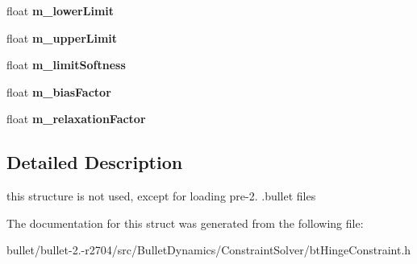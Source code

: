 \begin{DoxyCompactItemize}
\item 
\hypertarget{structbt_hinge_constraint_double_data_a4a3d074b01540cc915adba04f72924d0}{float {\bfseries m\+\_\+lower\+Limit}}\label{structbt_hinge_constraint_double_data_a4a3d074b01540cc915adba04f72924d0}

\item 
\hypertarget{structbt_hinge_constraint_double_data_a231ef521e7d4848c5b9226ff50dbbd12}{float {\bfseries m\+\_\+upper\+Limit}}\label{structbt_hinge_constraint_double_data_a231ef521e7d4848c5b9226ff50dbbd12}

\item 
\hypertarget{structbt_hinge_constraint_double_data_ad0ae0fdfdc31180fbeebf1d160c86b77}{float {\bfseries m\+\_\+limit\+Softness}}\label{structbt_hinge_constraint_double_data_ad0ae0fdfdc31180fbeebf1d160c86b77}

\item 
\hypertarget{structbt_hinge_constraint_double_data_ac94487908f2a28df8be317ef588fb382}{float {\bfseries m\+\_\+bias\+Factor}}\label{structbt_hinge_constraint_double_data_ac94487908f2a28df8be317ef588fb382}

\item 
\hypertarget{structbt_hinge_constraint_double_data_abdea05be210308a95a740b14f483e8c5}{float {\bfseries m\+\_\+relaxation\+Factor}}\label{structbt_hinge_constraint_double_data_abdea05be210308a95a740b14f483e8c5}

\end{DoxyCompactItemize}


\subsection{Detailed Description}
this structure is not used, except for loading pre-\/2. .bullet files 

The documentation for this struct was generated from the following file\+:\begin{DoxyCompactItemize}
\item 
bullet/bullet-\/2.-\/r2704/src/\+Bullet\+Dynamics/\+Constraint\+Solver/bt\+Hinge\+Constraint.\+h\end{DoxyCompactItemize}
